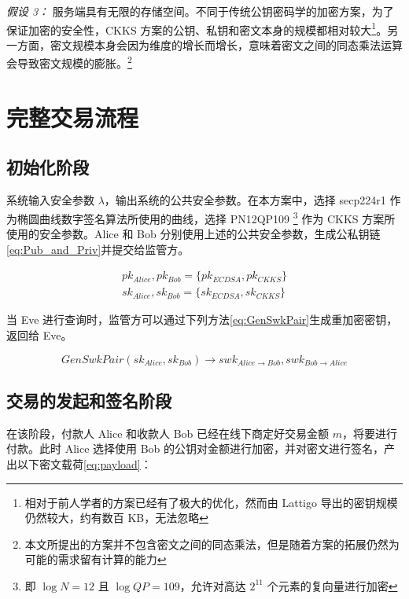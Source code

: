 \textit{假设 3：} 服务端具有无限的存储空间。不同于传统公钥密码学的加密方案，为了保证加密的安全性，CKKS 方案的公钥、私钥和密文本身的规模都相对较大\footnote{相对于前人学者的方案已经有了极大的优化，然而由 Lattigo 导出的密钥规模仍然较大，约有数百 KB，无法忽略}。另一方面，密文规模本身会因为维度的增长而增长，意味着密文之间的同态乘法运算会导致密文规模的膨胀。\footnote{本文所提出的方案并不包含密文之间的同态乘法，但是随着方案的拓展仍然为可能的需求留有计算的能力}

\section{完整交易流程}

\subsection*{初始化阶段}

系统输入安全参数 $\lambda$，输出系统的公共安全参数。在本方案中，选择 secp224r1 作为椭圆曲线数字签名算法所使用的曲线，选择 PN12QP109 \footnote{即 $\log N = 12$ 且 $\log QP = 109$，允许对高达 $2^{11}$ 个元素的复向量进行加密} 作为 CKKS 方案所使用的安全参数。Alice 和 Bob 分别使用上述的公共安全参数，生成公私钥链\eqref{eq:Pub_and_Priv}并提交给监管方。

\begin{equation} \label{eq:Pub_and_Priv}
\begin{aligned}
    pk_{Alice}, pk_{Bob} = \{pk_{ECDSA}, pk_{CKKS}\}\\
    sk_{Alice}, sk_{Bob} = \{sk_{ECDSA}, sk_{CKKS}\}
\end{aligned}
\end{equation}

当 Eve 进行查询时，监管方可以通过下列方法\eqref{eq:GenSwkPair}生成重加密密钥，返回给 Eve。

\begin{equation} \label{eq:GenSwkPair}
    GenSwkPair(sk_{Alice}, sk_{Bob}) \rightarrow swk_{Alice \rightarrow Bob},
    swk_{Bob \rightarrow Alice}
\end{equation}

\subsection*{交易的发起和签名阶段}

在该阶段，付款人 Alice 和收款人 Bob 已经在线下商定好交易金额 $m$，将要进行付款。此时 Alice 选择使用 Bob 的公钥对金额进行加密，并对密文进行签名，产出以下密文载荷\eqref{eq:payload}：

